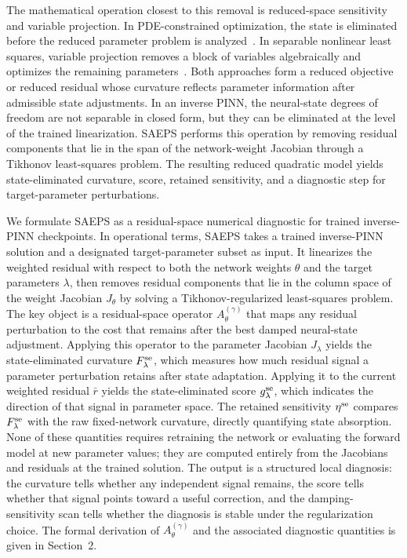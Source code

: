 \documentclass[preprint,12pt]{elsarticle}
\begin{document}
The mathematical operation closest to this removal is reduced-space sensitivity and variable projection.  In PDE-constrained optimization, the state is eliminated before the reduced parameter problem is analyzed~\cite{hinze2009optimization,biegler2007realtime}.  In separable nonlinear least squares, variable projection removes a block of variables algebraically and optimizes the remaining parameters~\cite{golub1973variable,golub2003separable}.  Both approaches form a reduced objective or reduced residual whose curvature reflects parameter information after admissible state adjustments.  In an inverse PINN, the neural-state degrees of freedom are not separable in closed form, but they can be eliminated at the level of the trained linearization.  SAEPS performs this operation by removing residual components that lie in the span of the network-weight Jacobian through a Tikhonov least-squares problem.  The resulting reduced quadratic model yields state-eliminated curvature, score, retained sensitivity, and a diagnostic step for target-parameter perturbations.

We formulate SAEPS as a residual-space numerical diagnostic for trained inverse-PINN checkpoints. In operational terms, SAEPS takes a trained inverse-PINN solution and a designated target-parameter subset as input.  It linearizes the weighted residual with respect to both the network weights $\theta$ and the target parameters $\lambda$, then removes residual components that lie in the column space of the weight Jacobian $J_\theta$ by solving a Tikhonov-regularized least-squares problem.  The key object is a residual-space operator $A_\theta^{(\gamma)}$ that maps any residual perturbation to the cost that remains after the best damped neural-state adjustment.  Applying this operator to the parameter Jacobian $J_\lambda$ yields the state-eliminated curvature $F_\lambda^{\rm se}$, which measures how much residual signal a parameter perturbation retains after state adaptation.  Applying it to the current weighted residual $\bar r$ yields the state-eliminated score $g_\lambda^{\rm se}$, which indicates the direction of that signal in parameter space.  The retained sensitivity $\eta^{\rm se}$ compares $F_\lambda^{\rm se}$ with the raw fixed-network curvature, directly quantifying state absorption.  None of these quantities requires retraining the network or evaluating the forward model at new parameter values; they are computed entirely from the Jacobians and residuals at the trained solution.  The output is a structured local diagnosis: the curvature tells whether any independent signal remains, the score tells whether that signal points toward a useful correction, and the damping-sensitivity scan tells whether the diagnosis is stable under the regularization choice.  The formal derivation of $A_\theta^{(\gamma)}$ and the associated diagnostic quantities is given in Section~2.
\end{document}
